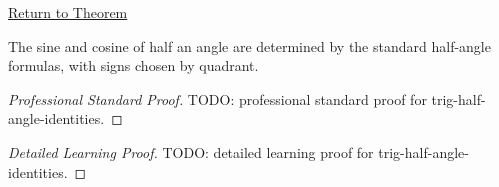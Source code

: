 \newpage
{}
\label{prf:trig-half-angle-identities}

\begin{remark*}[Return]
\hyperref[thm:trig-half-angle-identities]{Return to Theorem}
\end{remark*}

\begin{theorem*}
The sine and cosine of half an angle are determined by the standard
half-angle formulas, with signs chosen by quadrant.
\end{theorem*}

\begin{proof}[Professional Standard Proof]
\LRAProofBodyStart
TODO: professional standard proof for trig-half-angle-identities.
\end{proof}

\begin{proof}[Detailed Learning Proof]
\LRAProofBodyStart
TODO: detailed learning proof for trig-half-angle-identities.
\end{proof}

\clearpage
